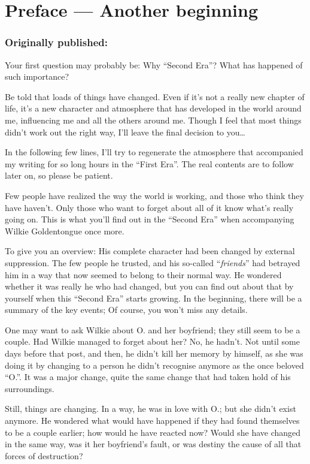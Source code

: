 \mainmatter
\chapter{Preface --- Another beginning}
\label{cha:preface}
\subsection*{Originally published: }
Your first question may probably be: Why \enquote{Second Era}? What has happened of such importance?

Be told that loads of things have changed. Even if it's not a really new chapter of life, it's a new character and atmosphere that has developed in the world around me, influencing me and all the others around me. Though I feel that most things didn't work out the right way, I'll leave the final decision to you\dots{}

In the following few lines, I'll try to regenerate the atmosphere that accompanied my writing for so long hours in the \enquote{First Era}. The real contents are to follow later on, so please be patient.

Few people have realized the way the world is working, and those who think they have haven't. Only those who want to forget about all of it know what's really going on. This is what you'll find out in the \enquote{Second Era} when accompanying Wilkie Goldentongue once more.

To give you an overview: His complete character had been changed by external suppression. The few people he trusted, and his so-called \enquote{\emph{friends}} had betrayed him in a way that now seemed to belong to their normal way. He wondered whether it was really he who had changed, but you can find out about that by yourself when this \enquote{Second Era} starts growing. In the beginning, there will be a summary of the key events; Of course, you won't miss any details.

One may want to ask Wilkie about O. and her boyfriend; they still seem to be a couple. Had Wilkie managed to forget about her? No, he hadn't. Not until some days before that post, and then, he didn't kill her memory by himself, as she was doing it by changing to a person he didn't recognise anymore as the once beloved \enquote{O.}. It was a major change, quite the same change that had taken hold of his surroundings.

Still, things are changing. In a way, he was in love with O.; but she didn't exist anymore. He wondered what would have happened if they had found themselves to be a couple earlier; how would he have reacted now? Would she have changed in the same way, was it her boyfriend's fault, or was destiny the cause of all that forces of destruction?

